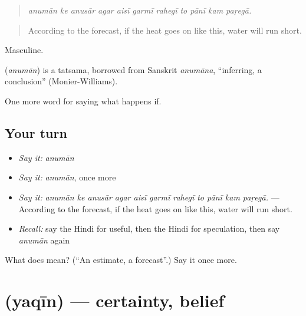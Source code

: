 \begin{quote}
          
\end{quote}

\begin{quote}
\emph{anumān ke anusār agar aisī garmī rahegī to pānī kam paṛegā.}
\end{quote}

\begin{quote}
According to the forecast, if the heat goes on like this, water will run short.
\end{quote}

Masculine.

\begin{cousinweb}
\textbf{} (\emph{anumān}) is a tatsama, borrowed from Sanskrit \emph{anumāna}, \textquotedblleft{}inferring, a conclusion\textquotedblright{} (Monier-Williams).
\end{cousinweb}

\begin{grammarlens}[title={What you've built}]
One more word for saying what happens if.
\end{grammarlens}

\subsection*{Your turn}
\begin{itemize}
\raggedright
  \item \emph{Say it:} \emph{anumān}
  \item \emph{Say it:} \emph{anumān}, once more
  \item \emph{Say it:} \emph{anumān ke anusār agar aisī garmī rahegī to pānī kam paṛegā.} — According to the forecast, if the heat goes on like this, water will run short.
  \item \emph{Recall:} say the Hindi for useful, then the Hindi for speculation, then say \emph{anumān} again
\end{itemize}

\begin{tcolorbox}[breakable,colback=teal!4,colframe=teal!35!black,title={Before you move on}]
What does  mean? (\textquotedblleft{}An estimate, a forecast\textquotedblright{}.) Say it once more.
\end{tcolorbox}
\section[\texorpdfstring{\hi{यक़ीन} (yaqīn)}{यक़ीन (yaqīn)}]{ (yaqīn) — certainty, belief}

